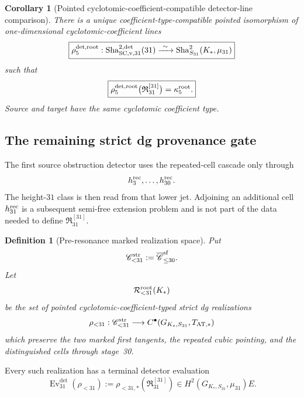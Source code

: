 \documentclass[11pt]{article}
\newtheorem{corollary}[theorem]{Corollary}
\newtheorem{definition}[theorem]{Definition}
\theoremstyle{remark}
\providecommand{\Sha}{\operatorname{Sha}}
\begin{document}
\begin{corollary}[Pointed cyclotomic-coefficient-compatible detector-line comparison]
\label{cor:v073-root-pointed-line}
There is a unique coefficient-type-compatible pointed isomorphism of
one-dimensional cyclotomic-coefficient lines
\begin{equation}
 \boxed{
 \rho_{5}^{\det,\rm root}:
 \Sha^{2,\det}_{\rm SC,v,31}(31)
 \xrightarrow{\ \sim\ }
 \Sha^2_{S_{31}}(K_*,\mu_{31})}
 \label{eq:v073-root-pointed-line}
\end{equation}
such that
\begin{equation}
 \boxed{
 \rho_{5}^{\det,\rm root}
 \bigl(\mathfrak R_{31}^{[31]}\bigr)
 =
 \kappa_5^{\rm root}.}
 \label{eq:v073-root-pointed-generator}
\end{equation}
Source and target have the same cyclotomic coefficient type.
\end{corollary}


\subsection{The remaining strict dg provenance gate}

The first source obstruction detector uses the repeated-cell cascade only through
\[
 h_3^{\rm rec},\ldots,h_{30}^{\rm rec}.
\]
The height-\(31\) class is then read from that lower jet.  Adjoining an
additional cell \(h_{31}^{\rm rec}\) is a subsequent semi-free extension
problem and is not part of the data needed to define
\(\mathfrak R_{31}^{[31]}\).

\begin{definition}[Pre-resonance marked realization space]
\label{def:v073-pre31-mapspace}
Put
\[
 \mathscr C_{<31}^{\rm str}
 :=
 \overline{\mathscr C}^{\rm sf}_{\le30}.
\]
Let
\[
 \mathcal R_{<31}^{\rm root}(K_*)
\]
be the set of pointed cyclotomic-coefficient-typed strict dg realizations
\begin{equation}
 \rho_{<31}:
 \mathscr C_{<31}^{\rm str}
 \longrightarrow
 C^\bullet(G_{K_*,S_{31}},T_{\rm AT,*})
 \label{eq:v073-pre31-map}
\end{equation}
which preserve the two marked first tangents, the repeated cubic pointing,
and the distinguished cells through stage~30.
\end{definition}

Every such realization has a terminal detector evaluation
\begin{equation}
 \boxed{
 \operatorname{Ev}_{31}^{\det}(\rho_{<31})
 :=
 \rho_{<31,*}(\mathfrak R_{31}^{[31]})
 \in
 H^2(G_{K_*,S_{31}},\mu_{31})E.}
 \label{eq:v073-det-evaluation}
\end{equation}
\end{document}
